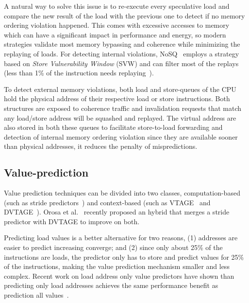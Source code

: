 \documentclass{sig-alternate}
\begin{document}
A natural way to solve this issue is to re-execute every speculative load and compare the new result of the load with the previous one to detect if no memory ordering violation happened. This comes with excessive accesses to memory which can have a significant impact in performance and energy, so modern strategies validate most memory bypassing and coherence while minimizing the replaying of loads. For detecting internal violations, NoSQ~\cite{} employs a strategy based on \textit{Store Vulnerability Window} (SVW) and can filter most of the replays (less than 1\% of the instruction needs replaying~\cite{}).

To detect external memory violations, both load and store-queues of the CPU hold the physical address of their respective load or store instructions. Both structures are exposed to coherence traffic and invalidation requests that match any load/store address will be squashed and replayed. The virtual address are also stored in both these queues to facilitate store-to-load forwarding and detection of internal memory ordering violation since they are available sooner than physical addresses, it reduces the penalty of mispredictions.     

\subsection{Value-prediction}
Value prediction techniques can be divided into two classes, computation-based (such as stride predictors~\cite{}) and context-based (such as VTAGE~\cite{} and DVTAGE~\cite{}).  Orosa et al.~\cite{} recently proposed an hybrid that  merges a stride predictor with DVTAGE to improve on both.   

Predicting load values is a better alternative for two reasons, (1) addresses are easier to predict increasing converge; and (2) since only about 25\% of the instructions are loads, the predictor only has to store and predict values for 25\% of the instructions, making the value prediction mechanism smaller and less complex. Recent work on load address only value predictors have shown than predicting only load addresses achieves the same performance benefit as prediction all values~\cite{}.
\end{document}

